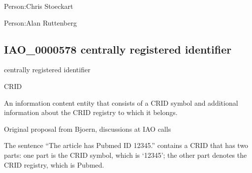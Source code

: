 \documentclass[letterpaper,10pt,english]{sphinxmanual}
\begin{document}
\begin{sphinxShadowBox}

\sphinxAtStartPar
Person:Chris Stoeckart

\sphinxAtStartPar
Person:Alan Ruttenberg
\end{sphinxShadowBox}
\begin{quote}

\ignorespaces \end{quote}


\subsection{IAO\_0000578 \sphinxhyphen{} centrally registered identifier}
\label{\detokenize{doc-IAO_0000578:iao-0000578-centrally-registered-identifier}}\label{\detokenize{doc-IAO_0000578:index-0}}\label{\detokenize{doc-IAO_0000578::doc}}
\begin{sphinxShadowBox}

\sphinxAtStartPar
centrally registered identifier
\end{sphinxShadowBox}

\begin{sphinxShadowBox}

\sphinxAtStartPar
CRID
\end{sphinxShadowBox}

\begin{sphinxShadowBox}

\sphinxAtStartPar
An information content entity that consists of a CRID symbol and additional information about the CRID registry to which it belongs.
\end{sphinxShadowBox}

\begin{sphinxShadowBox}

\sphinxAtStartPar
Original proposal from Bjoern, discussions at IAO calls
\end{sphinxShadowBox}

\begin{sphinxShadowBox}

\sphinxAtStartPar
The sentence “The article has Pubmed ID 12345.” contains a CRID that has two parts: one part is the CRID symbol, which is ‘12345’; the other part denotes the CRID registry, which is Pubmed.
\end{sphinxShadowBox}
\end{document}
